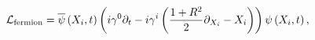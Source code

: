 \begin{equation}
\label{L1}
{\cal L}_{{\rm fermion}} = {\overline \psi} \left(X_i,t \right) 
\left( i \gamma^0 \partial_t - 
i \gamma^i \left(\frac{1+R^2}{2} \partial_{X_i} - X_i \right)
\right)
\psi \left(X_i,t \right),
\end{equation}

